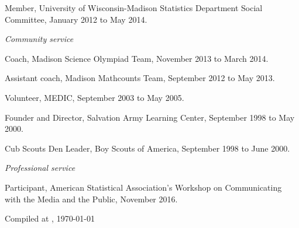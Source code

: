 \documentclass[11pt,article,oneside]{memoir}
\begin{document}
\ind Member, University of Wisconsin-Madison Statistics Department Social Committee, January 2012 to
May 2014.

\medskip

\noindent\emph{Community service \vspace{0.05in}}

\ind Coach, Madison Science Olympiad Team, November 2013 to March 2014.

\ind Assistant coach, Madison Mathcounts Team, September 2012 to May 2013.

\ind Volunteer, MEDIC, September 2003 to May 2005.

\ind Founder and Director, Salvation Army Learning Center, September 1998 to May 2000.

\ind Cub Scouts Den Leader, Boy Scouts of America, September 1998 to June 2000.

\medskip

\noindent\emph{Professional service \vspace{0.05in}}

\ind Participant, American Statistical Association's Workshop on Communicating with the Media and the Public, November 2016.

\bigskip

\centering
{\tiny Compiled at \currenttime, \today}

\medskip
\end{document}
